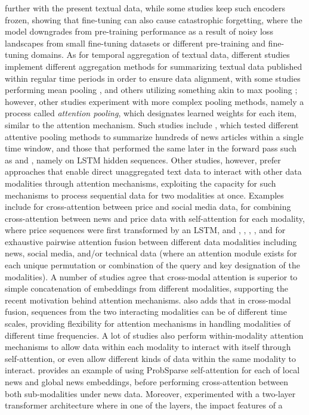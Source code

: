 \documentclass[stu,floatsintext]{apa7}
\begin{document}
further with the present textual data, while some studies \parencite{bustarviejo2026multimodal,chen2026newsdriven} keep such encoders frozen, showing that fine-tuning can also cause catastrophic forgetting, where the model downgrades from pre-training performance as a result of noisy loss landscapes from small fine-tuning datasets or different pre-training and fine-tuning domains. As for temporal aggregation of textual data, different studies implement different aggregation methods for summarizing textual data published within regular time periods in order to ensure data alignment, with some studies performing mean pooling \parencite{sun2026intelligent}, and others utilizing something akin to max pooling \parencite{chen2024deep}; however, other studies experiment with more complex pooling methods, namely a process called \textit{attention pooling}, which designates learned weights for each item, similar to the attention mechanism. Such studies include \parencite{liao2026generalized}, which tested different attentive pooling methods to summarize hundreds of news articles within a single time window, and those that performed the same later in the forward pass such as \textcite{arora2019using} and \textcite{sun2026intelligent}, namely on LSTM hidden sequences. Other studies, however, prefer approaches that enable direct unaggregated text data to interact with other data modalities through attention mechanisms, exploiting the capacity for such mechanisms to process sequential data for two modalities at once. Examples include \textcite{he2021multimodal} for cross-attention between price and social media data, \textcite{fataliyev2023mcasp} for combining cross-attention between news and price data with self-attention for each modality, where price sequences were first transformed by an LSTM, and \textcite{albada2025predicting}, \textcite{bustarviejo2026multimodal}, \textcite{chen2024deep}, \textcite{dashtaki2025hsif}, and \textcite{liao2026generalized} for exhaustive pairwise attention fusion between different data modalities including news, social media, and/or technical data (where an attention module exists for each unique permutation or combination of the query and key designation of the modalities). A number of studies \parencite{jang2025selective,ridhawi2026stock,wang2026multimodal} agree that cross-modal attention is superior to simple concatenation of embeddings from different modalities, supporting the recent motivation behind attention mechanisms. \textcite{wang2026multimodal} also adds that in cross-modal fusion, sequences from the two interacting modalities can be of different time scales, providing flexibility for attention mechanisms in handling modalities of different time frequencies. A lot of studies also perform within-modality attention mechanisms to allow data within each modality to interact with itself through self-attention, or even allow different kinds of data within the same modality to interact. \textcite{chen2026newsdriven} provides an example of using ProbSparse self-attention for each of local news and global news embeddings, before performing cross-attention between both sub-modalities under news data. Moreover, \textcite{he2021multimodal} experimented with a two-layer transformer architecture where in one of the layers, the impact features of a 
\end{document}
